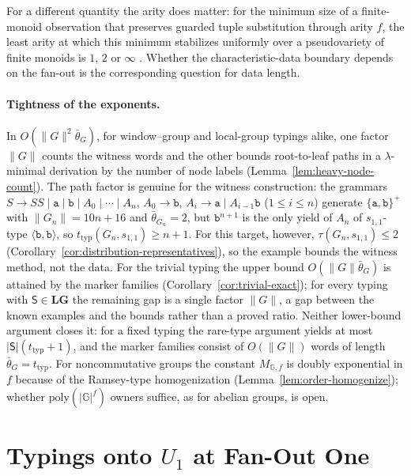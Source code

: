 For a different quantity the arity does matter: for the minimum size of a
finite-monoid observation that preserves guarded tuple substitution through
arity $f$, the least arity at which this minimum stabilizes uniformly over a
pseudovariety of finite monoids is $1$, $2$ or $\infty$
\cite{KuriyamaSCL2026}.  Whether the characteristic-data boundary depends on
the fan-out is the corresponding question for data length.

\paragraph{Tightness of the exponents.}
In $O(\|G\|^2\bar\theta_G)$, for window--group and local-group typings alike,
one factor $\|G\|$ counts the witness words and the other bounds root-to-leaf
paths in a $\lambda$-minimal derivation by the number of node labels
(Lemma~\ref{lem:heavy-node-count}).  The path factor is genuine for the witness
construction: the grammars $S\to SS\mid\mathtt a\mid\mathtt b\mid A_0\mid\cdots\mid A_n$,
$A_0\to\mathtt b$, $A_i\to\mathtt a\mid A_{i-1}\mathtt b$ ($1\le i\le n$) generate
$\{\mathtt a,\mathtt b\}^+$ with $\|G_n\|=10n+16$ and $\bar\theta_{G_n}=2$, but
$\mathtt b^{n+1}$ is the only yield of $A_n$ of $s_{1,1}$-type
$\langle\mathtt b,\mathtt b\rangle$, so $t_{\mathrm{typ}}(G_n,s_{1,1})\ge n+1$.  For this
target, however, $\tau(G_n,s_{1,1})\le2$
(Corollary~\ref{cor:distribution-representatives}), so the example bounds the
witness method, not the data.  For the trivial typing the upper bound
$O(\|G\|\bar\theta_G)$ is attained by the marker families
(Corollary~\ref{cor:trivial-exact}); for
every typing with $\mathsf S\in\mathbf{LG}$ the remaining gap is a single factor
$\|G\|$, a gap between the known examples and the bounds rather than a proved
ratio.  Neither lower-bound argument closes it: for a fixed typing the
rare-type argument yields at most $|\mathsf S|(t_{\mathrm{typ}}+1)$, and the marker
families consist of $O(\|G\|)$ words of length $\bar\theta_G=t_{\mathrm{typ}}$.
For noncommutative
groups the constant $M_{\mathbb G,f}$ is doubly exponential in $f$ because of the
Ramsey-type homogenization (Lemma~\ref{lem:order-homogenize}); whether
$\mathrm{poly}(|\mathbb G|^f)$ owners suffice, as for abelian groups, is open.


\section{Typings onto \texorpdfstring{$U_1$}{U1} at Fan-Out One}
\label{app:u1-typings}

